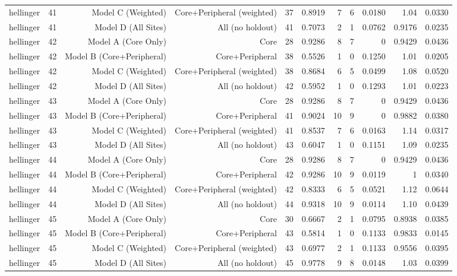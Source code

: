 {\begin{longtable}{lrrrrrrrrrr}
  hellinger & 41 & Model C (Weighted) & Core+Peripheral (weighted) & 37 & 0.8919 & 7 & 6 & 0.0180 & 1.04 & 0.0330 \\
  hellinger & 41 & Model D (All Sites) & All (no holdout) & 41 & 0.7073 & 2 & 1 & 0.0762 & 0.9176 & 0.0235 \\
  hellinger & 42 & Model A (Core Only) & Core & 28 & 0.9286 & 8 & 7 & 0 & 0.9429 & 0.0436 \\
  hellinger & 42 & Model B (Core+Peripheral) & Core+Peripheral & 38 & 0.5526 & 1 & 0 & 0.1250 & 1.01 & 0.0205 \\
  hellinger & 42 & Model C (Weighted) & Core+Peripheral (weighted) & 38 & 0.8684 & 6 & 5 & 0.0499 & 1.08 & 0.0520 \\
  hellinger & 42 & Model D (All Sites) & All (no holdout) & 42 & 0.5952 & 1 & 0 & 0.1293 & 1.01 & 0.0223 \\
  hellinger & 43 & Model A (Core Only) & Core & 28 & 0.9286 & 8 & 7 & 0 & 0.9429 & 0.0436 \\
  hellinger & 43 & Model B (Core+Peripheral) & Core+Peripheral & 41 & 0.9024 & 10 & 9 & 0 & 0.9882 & 0.0380 \\
  hellinger & 43 & Model C (Weighted) & Core+Peripheral (weighted) & 41 & 0.8537 & 7 & 6 & 0.0163 & 1.14 & 0.0317 \\
  hellinger & 43 & Model D (All Sites) & All (no holdout) & 43 & 0.6047 & 1 & 0 & 0.1151 & 1.09 & 0.0235 \\
  hellinger & 44 & Model A (Core Only) & Core & 28 & 0.9286 & 8 & 7 & 0 & 0.9429 & 0.0436 \\
  hellinger & 44 & Model B (Core+Peripheral) & Core+Peripheral & 42 & 0.9286 & 10 & 9 & 0.0119 & 1 & 0.0340 \\
  hellinger & 44 & Model C (Weighted) & Core+Peripheral (weighted) & 42 & 0.8333 & 6 & 5 & 0.0521 & 1.12 & 0.0644 \\
  hellinger & 44 & Model D (All Sites) & All (no holdout) & 44 & 0.9318 & 10 & 9 & 0.0114 & 1.10 & 0.0439 \\
  hellinger & 45 & Model A (Core Only) & Core & 30 & 0.6667 & 2 & 1 & 0.0795 & 0.8938 & 0.0385 \\
  hellinger & 45 & Model B (Core+Peripheral) & Core+Peripheral & 43 & 0.5814 & 1 & 0 & 0.1133 & 0.9833 & 0.0145 \\
  hellinger & 45 & Model C (Weighted) & Core+Peripheral (weighted) & 43 & 0.6977 & 2 & 1 & 0.1133 & 0.9556 & 0.0395 \\
  hellinger & 45 & Model D (All Sites) & All (no holdout) & 45 & 0.9778 & 9 & 8 & 0.0148 & 1.03 & 0.0399 \\

\end{longtable}}
